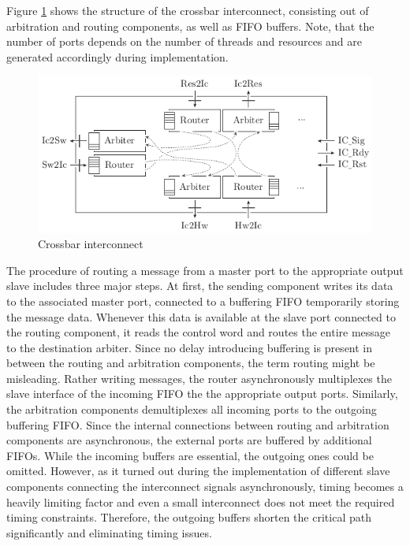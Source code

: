 Figure \ref{fig:crossbar} shows the structure of the crossbar interconnect,
consisting out of arbitration and routing components, as well as \ac{FIFO}
buffers. Note, that the number of ports depends on the number of threads and
resources and are generated accordingly during implementation.
\begin{figure}[tb]
	\centering
	\includegraphics[width=12cm]{../figures/crossbar}
	\caption{Crossbar interconnect}
	\label{fig:crossbar}
\end{figure}
The procedure of routing a message from a master port to the appropriate
output slave includes three major steps. At first, the sending component
writes its data to the associated master port, connected to a buffering
\ac{FIFO} temporarily storing the message data. Whenever this data is
available at the slave port connected to the routing component, it reads the
control word and routes the entire message to the destination arbiter. Since
no delay introducing buffering is present in between the routing and
arbitration components, the term routing might be misleading. Rather writing
messages, the router asynchronously multiplexes the slave interface of the
incoming \ac{FIFO} the the appropriate output ports. Similarly, the
arbitration components demultiplexes all incoming ports to the outgoing
buffering \ac{FIFO}. Since the internal connections between routing and
arbitration components are asynchronous, the external ports are buffered by
additional \acp{FIFO}. While the incoming buffers are essential, the outgoing
ones could be omitted. However, as it turned out during the implementation of
different slave components connecting the interconnect signals asynchronously,
timing becomes a heavily limiting factor and even a small interconnect does
not meet the required timing constraints. Therefore, the outgoing buffers shorten the critical path significantly and eliminating timing issues.

